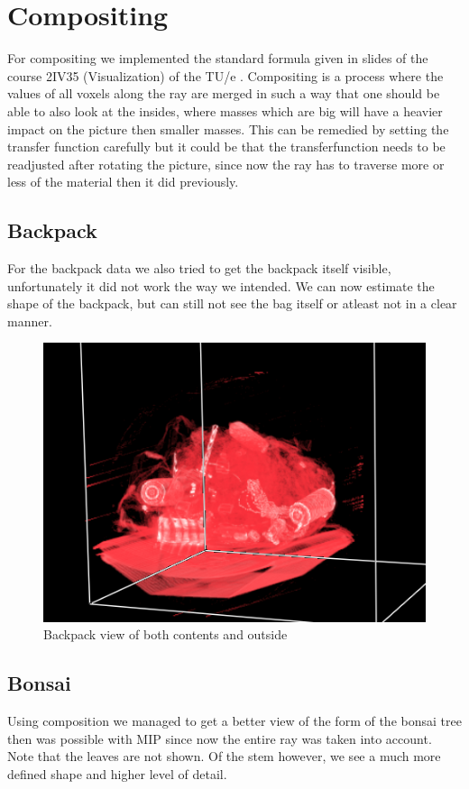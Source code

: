 \documentclass[a4paper,twoside,11pt]{article}
\begin{document}
 
 \section{Compositing}
 For compositing we implemented the standard formula given in slides of the course 2IV35 (Visualization) of the TU/e \cite{slideVis_m}. Compositing is a process where the values of all voxels along the ray are merged in such a way that one should be able to also look at the insides, where masses which are big will have a heavier impact on the picture then smaller masses. This can be remedied by setting the transfer function carefully but it could be that the transferfunction needs to be readjusted after rotating the picture, since now the ray has to traverse more or less of the material then it did previously.
 
 \subsection{Backpack}
 For the backpack data we also tried to get the backpack itself visible, unfortunately it did not work the way we intended. We can now estimate the shape of the backpack, but can still not see the bag itself or atleast not in a clear manner.
 
 \begin{figure}[h]
 \centering
 \includegraphics[scale=0.7]{images/backpackComp}
 \caption{Backpack view of both contents and outside}
 \label{backpackComp}
 \end{figure}
 
 \subsection{Bonsai}
 Using composition we managed to get a better view of the form of the bonsai tree then was possible with MIP since now the entire ray was taken into account. Note that the leaves are not shown. Of the stem however, we see a much more defined shape and higher level of detail.
 
\end{document}
